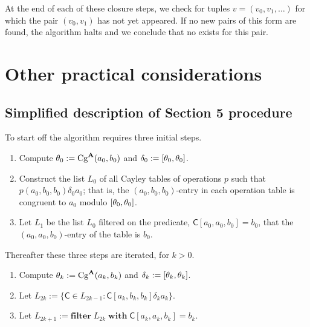 At the end of each of these closure steps, we check for
tuples $v = (v_0, v_1, \dots)$ for which the pair $(v_0, v_1)$ has not
yet appeared.  If no new pairs of this form are found, the algorithm halts
and we conclude that no \ldto exists for this pair.

\section{Other practical considerations}
\subsection{Simplified description of Section 5 procedure}
To start off the algorithm requires three initial steps.
\begin{enumerate}
  \item Compute $\theta_0 := \operatorname{Cg}^{\mathbf{A}}(a_0, b_0)$ and $\delta_0 := [\theta_0, \theta_0]$.
  \item Construct the list $L_0$ of all Cayley tables of operations $p$
  such that $p(a_0, b_0, b_0) \mathrel{\delta_0} a_0$; that is, the
  $(a_0, b_0, b_0)$-entry in each operation table is congruent to $a_0$ modulo $[\theta_0, \theta_0]$.
  \item Let $L_1$ be the list $L_0$ filtered on the predicate,
  $\mathsf{C}[a_0, a_0, b_0] = b_0$, that the $(a_0, a_0, b_0)$-entry of
  the table is $b_0$.
\end{enumerate}
Thereafter these three steps are iterated, for $k> 0$.
\begin{enumerate}
  \item Compute $\theta_{k} := \operatorname{Cg}^{\mathbf{A}}(a_k, b_k)$ and $\delta_{k} := [\theta_{k}, \theta_{k}]$.
  \item Let $L_{2k} := \{\mathsf{C} \in L_{2k-1} \colon \mathsf{C}[a_k, b_k, b_k] \mathrel{\delta_{k}} a_k \}$.
  \item Let $L_{2k+1} := \mathbf{filter} \; L_{2k} \; \mathbf{with} \; \mathsf{C}[a_k, a_k, b_k] = b_k$.
\end{enumerate}
